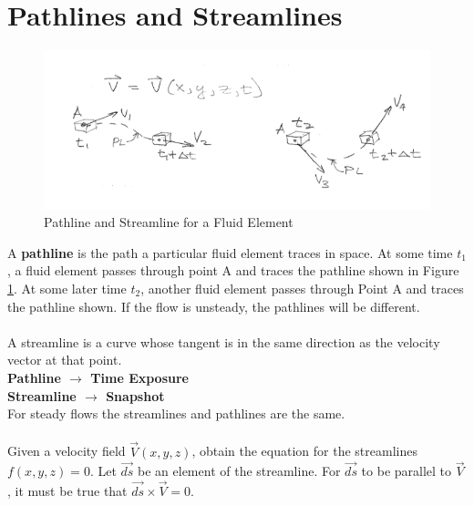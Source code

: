 \documentclass[draft=false, titlepage]{article}
\begin{document}
\section{Pathlines and Streamlines}
\begin{figure}
    \centering
    \includegraphics[width=0.9\linewidth]{Figures/pathline_streamline.PNG}
    \caption{Pathline and Streamline for a Fluid Element}
    \label{fig:PathlineStreamline}
\end{figure}

A \textbf{pathline} is the path a particular fluid element traces in space. At some time $t_1$, a fluid element passes through point A and traces the pathline shown in Figure \ref{fig:PathlineStreamline}. At some later time $t_2$, another fluid element passes through Point A and traces the pathline shown. If the flow is unsteady, the pathlines will be different.
 \paragraph*{} A streamline is a curve whose tangent is in the same direction as the velocity vector at that point.\\
 \textbf{Pathline $\rightarrow$ Time Exposure}\\
 \textbf{Streamline $\rightarrow$ Snapshot}\\
 For steady flows the streamlines and pathlines are the same.
 
 \paragraph*{} Given a velocity field $\vec{V}(x, y, z)$, obtain the equation for the streamlines $f(x, y, z) = 0$. Let $\vec{ds}$ be an element of the streamline. For $\vec{ds}$ to be parallel to $\vec{V}$, it must be true that $\vec{ds} \times \vec{V} = 0$.
 
\end{document}
